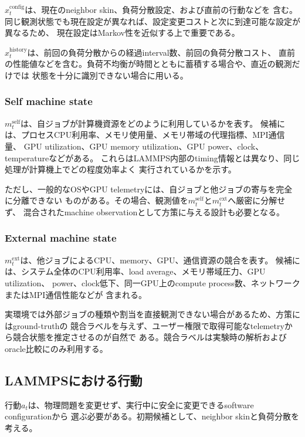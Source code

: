 $x_t^{\mathrm{config}}$は、現在のneighbor skin、負荷分散設定、および直前の行動などを
含む。同じ観測状態でも現在設定が異なれば、設定変更コストと次に到達可能な設定が異なるため、
現在設定はMarkov性を近似する上で重要である。

$x_t^{\mathrm{history}}$は、前回の負荷分散からの経過interval数、前回の負荷分散コスト、
直前の性能値などを含む。負荷不均衡が時間とともに蓄積する場合や、直近の観測だけでは
状態を十分に識別できない場合に用いる。

\subsubsection{Self machine state}

$m_t^{\mathrm{self}}$は、自ジョブが計算機資源をどのように利用しているかを表す。
候補には、プロセスCPU利用率、メモリ使用量、メモリ帯域の代理指標、MPI通信量、
GPU utilization、GPU memory utilization、GPU power、clock、temperatureなどがある。
これらはLAMMPS内部のtiming情報とは異なり、同じ処理が計算機上でどの程度効率よく
実行されているかを示す。

ただし、一般的なOSやGPU telemetryには、自ジョブと他ジョブの寄与を完全に分離できない
ものがある。その場合、観測値を$m_t^{\mathrm{self}}$と$m_t^{\mathrm{ext}}$へ厳密に分解せず、
混合されたmachine observationとして方策に与える設計も必要となる。

\subsubsection{External machine state}

$m_t^{\mathrm{ext}}$は、他ジョブによるCPU、memory、GPU、通信資源の競合を表す。
候補には、システム全体のCPU利用率、load average、メモリ帯域圧力、GPU utilization、
power、clock低下、同一GPU上のcompute process数、ネットワークまたはMPI通信性能などが
含まれる。

実環境では外部ジョブの種類や割当を直接観測できない場合があるため、方策にはground-truthの
競合ラベルを与えず、ユーザー権限で取得可能なtelemetryから競合状態を推定させるのが自然で
ある。競合ラベルは実験時の解析およびoracle比較にのみ利用する。

\subsection{LAMMPSにおける行動}

行動$a_t$は、物理問題を変更せず、実行中に安全に変更できるsoftware configurationから
選ぶ必要がある。初期候補として、neighbor skinと負荷分散を考える。

